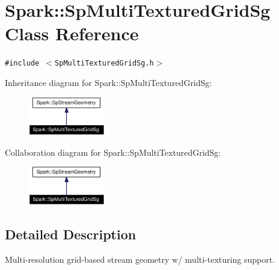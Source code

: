 \section{Spark::Sp\-Multi\-Textured\-Grid\-Sg Class Reference}
\label{classSpark_1_1SpMultiTexturedGridSg}
{\tt \#include $<$Sp\-Multi\-Textured\-Grid\-Sg.h$>$}

Inheritance diagram for Spark::Sp\-Multi\-Textured\-Grid\-Sg:\begin{figure}[H]
\begin{center}
\leavevmode
\includegraphics[width=94pt]{classSpark_1_1SpMultiTexturedGridSg__inherit__graph}
\end{center}
\end{figure}
Collaboration diagram for Spark::Sp\-Multi\-Textured\-Grid\-Sg:\begin{figure}[H]
\begin{center}
\leavevmode
\includegraphics[width=94pt]{classSpark_1_1SpMultiTexturedGridSg__coll__graph}
\end{center}
\end{figure}


\subsection{Detailed Description}
Multi-resolution grid-based stream geometry w/ multi-texturing support. 

